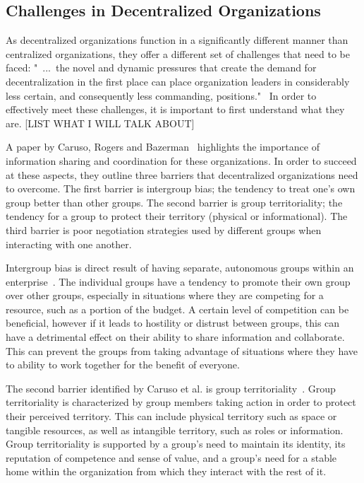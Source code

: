 \subsection{Challenges in Decentralized Organizations}

As decentralized organizations function in a significantly different manner than centralized organizations, they offer a different set of challenges that need to be faced: "~...~the novel and dynamic pressures that create the demand for decentralization in the first place can place organization leaders in considerably less certain, and consequently less commanding, positions."~\cite{caruso2008boundaries} In order to effectively meet these challenges, it is important to first understand what they are. [LIST WHAT I WILL TALK ABOUT]

A paper by Caruso, Rogers and Bazerman~\cite{caruso2008boundaries} highlights the importance of information sharing and coordination for these organizations. In order to succeed at these aspects, they outline three barriers that decentralized organizations need to overcome. The first barrier is intergroup bias; the tendency to treat one's own group better than other groups. The second barrier is group territoriality; the tendency for a group to protect their territory (physical or informational). The third barrier is poor negotiation strategies used by different groups when interacting with one another. 

Intergroup bias is direct result of having separate, autonomous groups within an enterprise~\cite{caruso2008boundaries}. The individual groups have a tendency to promote their own group over other groups, especially in situations where they are competing for a resource, such as a portion of the budget. A certain level of competition can be beneficial, however if it leads to hostility or distrust between groups, this can have a detrimental effect on their ability to share information and collaborate. This can prevent the groups from taking advantage of situations where they have to ability to work together for the benefit of everyone. 

The second barrier identified by Caruso et al. is group territoriality~\cite{caruso2008boundaries}. Group territoriality is characterized by group members taking action in order to protect their perceived territory. This can include physical territory such as space or tangible resources, as well as intangible territory, such as roles or information. Group territoriality is supported by a group's need to maintain its identity, its reputation of competence and sense of value, and a group's need for a stable home within the organization from which they interact with the rest of it.

